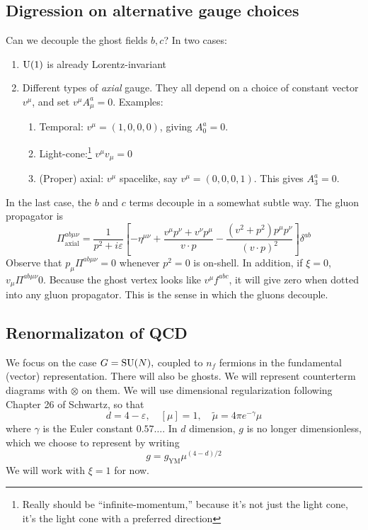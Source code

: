 \subsection*{Digression on alternative gauge choices}
Can we decouple the ghost fields $b,c$?
In two cases:
\begin{enumerate}
    \item $\operatorname{U}(1)$ is already Lorentz-invariant 
    \item Different types of \emph{axial} gauge.
    They all depend on a choice of constant vector $v^\mu$, and set $v^\mu A_\mu^a = 0$.
    Examples:
    \begin{enumerate}
        \item Temporal: $v^\mu = (1,0,0,0)$, giving $A_0^a = 0$.
        \item Light-cone:\footnote{Really should be ``infinite-momentum,'' because it's not just the light cone, it's the light cone with a preferred direction} $v^\mu v_\mu = 0$
        \item (Proper) axial: $v^\mu$ spacelike, say $v^\mu = (0,0,0,1)$.
        This gives $A_3^a = 0$.
    \end{enumerate}
\end{enumerate}
In the last case, the $b$ and $c$ terms decouple in a somewhat subtle way.
The gluon propagator is
\[
\Pi^{ab \mu \nu}_{\text{axial}} = \frac{1}{p^2 + i \varepsilon} \left[ - \eta^{\mu \nu} + \frac{v^\mu p^\nu + v^\nu p^\mu}{v \cdot p} - \frac{(v^2 + p^2) p^\mu p^\nu}{(v \cdot p)^2}\right]\delta^{ab}
\]
Observe that $p_\mu \Pi^{ab \mu \nu} = 0$ whenever $p^2 = 0$ is on-shell.
In addition, if $\xi = 0$, $v_\mu \Pi^{ab \mu \nu} 0$.
Because the ghost vertex looks like $v^\mu f^{abc}$, it will give zero when dotted into any gluon propagator.
This is the sense in which the gluons decouple.

\subsection*{Renormalizaton of QCD}
We focus on the case $G = \operatorname{SU}(N),$ coupled to $n_f$ fermions in the fundamental (vector) representation.
There will also be ghosts.
We will represent counterterm diagrams with $\otimes$ on them.
We will use dimensional regularization following Chapter 26 of Schwartz, so that
\[
d = 4- \varepsilon, \quad [\mu] = 1, \quad \tilde \mu = 4 \pi e^{- \gamma} \mu
\]
where $\gamma$ is the Euler constant $0.57\dots$.
In $d$ dimension, $g$ is no longer dimensionless, which we choose to represent by writing
\[
g = g_{\text{YM}} \mu^{(4-d)/2}
\]
We will work with $\xi = 1$ for now.

